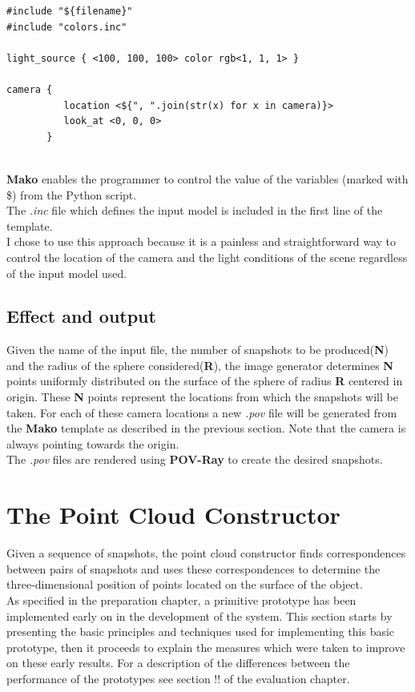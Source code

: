 \documentclass[12pt,a4paper,twoside,openright]{report}
\begin{document}
\begin{verbatim}
#include "${filename}"
#include "colors.inc"

light_source { <100, 100, 100> color rgb<1, 1, 1> }

camera {
          location <${", ".join(str(x) for x in camera)}>
          look_at <0, 0, 0>
       }
\end{verbatim} \\

\textbf{Mako} enables the programmer to control the value of the variables (marked with \$) from the Python script. \\
The \textit{.inc} file which defines the input model is included in the first line of the template. \\
I chose to use this approach because it is a painless and straightforward way to control the location of the camera and the light conditions of the scene regardless of the input model used. 

\subsection{Effect and output}
Given the name of the input file, the number of snapshots to be produced(\textbf{N}) and the radius of the sphere considered(\textbf{R}), the image generator determines \textbf{N} points uniformly distributed on the surface of the sphere of radius \textbf{R} centered in origin. These \textbf{N} points represent the locations from which the snapshots will be taken. For each of these camera locations a new \textit{.pov} file will be generated from the \textbf{Mako} template as described in the previous section. Note that the camera is always pointing towards the origin. \\
The \textit{.pov} files are rendered using \textbf{POV-Ray} to create the desired snapshots.

\section{The Point Cloud Constructor}
Given a sequence of snapshots, the point cloud constructor finds correspondences between pairs of snapshots and uses these correspondences to determine the three-dimensional position of points located on the surface of the object. \\
\linebreak
As specified in the preparation chapter, a primitive prototype has been implemented early on in the development of the system. This section starts by presenting the basic principles and techniques used for implementing this basic prototype, then it proceeds to explain the measures which were taken to improve on these early results. For a description of the differences between the performance of the prototypes see section !! of the evaluation chapter.
\end{document}
